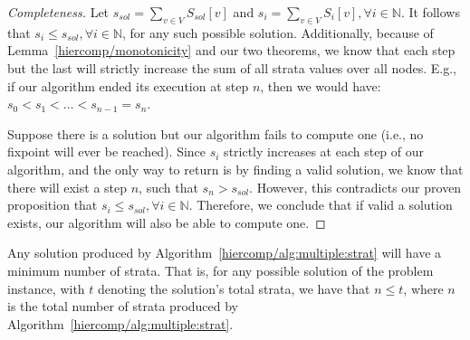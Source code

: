 \begin{proof}[Completeness]

  \noindent
  Let $s_{sol} = \sum_{v \in V} S_{sol}[v]$ and $s_{i} = \sum_{v \in
    V} S_{i}[v], \forall i \in \mathbb{N}$. It follows that $s_i \leq
  s_{sol}, \forall i \in \mathbb{N}$, for any such possible
  solution. Additionally, because of Lemma~\ref{hiercomp/monotonicity} and our
  two theorems, we know
  that each step but the last will strictly increase the sum of all
  strata values over all nodes. E.g., if our algorithm ended its
  execution at step $n$,
  then we would have: $s_0 < s_1 < \ldots < s_{n-1} = s_n$.


  Suppose there is a solution but our algorithm fails to compute one
  (i.e., no fixpoint will ever be reached). Since $s_{i}$ strictly
  increases at each step of our algorithm, and the only way to return
  is by finding a valid solution, we know that there will exist a step
  $n$, such that $s_n > s_{sol}$. However, this contradicts our proven
  proposition that $s_i \leq s_{sol}, \forall i \in
  \mathbb{N}$. Therefore, we conclude that if valid a solution exists,
  our algorithm will also be able to compute one.

\end{proof}

\vspace{3em}
\begin{thm}[Principality]
  Any solution produced by Algorithm~\ref{hiercomp/alg:multiple:strat}
  will have a minimum number of strata. That is, for any possible
  solution of the problem instance, with $t$ denoting the solution's
  total strata, we have that $n \leq t$, where $n$ is the total number
  of strata produced by Algorithm~\ref{hiercomp/alg:multiple:strat}.
\end{thm}

